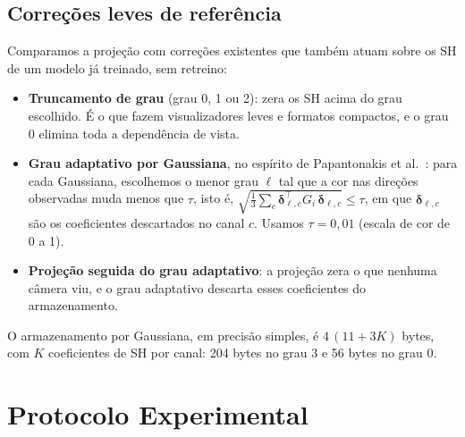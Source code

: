 \documentclass[conference]{IEEEtran}
\begin{document}
\subsection{Correções leves de referência}\label{sec:leves}

Comparamos a projeção com correções existentes que também atuam sobre os SH de um modelo já treinado, sem retreino:
\begin{itemize}
\item \textbf{Truncamento de grau} (grau 0, 1 ou 2): zera os SH acima do grau escolhido. É o que fazem visualizadores leves e formatos compactos, e o grau 0 elimina toda a dependência de vista.
\item \textbf{Grau adaptativo por Gaussiana}, no espírito de Papantonakis et al.~\cite{papantonakis2024reducing}: para cada Gaussiana, escolhemos o menor grau $\ell$ tal que a cor nas direções observadas muda menos que $\tau$, isto é, $\sqrt{\tfrac{1}{3}\sum_c \boldsymbol{\delta}_{\ell,c}^\top G_i\, \boldsymbol{\delta}_{\ell,c}} \le \tau$, em que $\boldsymbol{\delta}_{\ell,c}$ são os coeficientes descartados no canal $c$. Usamos $\tau = 0{,}01$ (escala de cor de 0 a 1).
\item \textbf{Projeção seguida do grau adaptativo}: a projeção zera o que nenhuma câmera viu, e o grau adaptativo descarta esses coeficientes do armazenamento.
\end{itemize}
O armazenamento por Gaussiana, em precisão simples, é $4\,(11 + 3K)$ bytes, com $K$ coeficientes de SH por canal: 204 bytes no grau 3 e 56 bytes no grau 0.

\section{Protocolo Experimental}\label{sec:exp}
\end{document}
